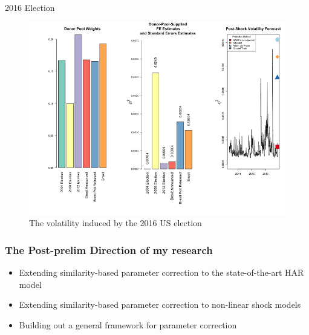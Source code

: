 \documentclass[9pt]{beamer}
\theoremstyle{definition}
\begin{document}
    \begin{frame}{2016 Election}
        \begin{figure}[H]
            \begin{center}
              \includegraphics[scale=.34]{real_data_output_plots/TueSep241059512024_IYG_None_None.png}
              \caption{The volatility induced by the 2016 US election}
              \label{fig:SVF_2016}
              \end{center}
            \end{figure}
    \end{frame}

\begin{frame}
    \frametitle{The Post-prelim Direction of my research}
    
    \begin{itemize}
        \item Extending similarity-based parameter correction to the state-of-the-art HAR model 
        \item Extending similarity-based parameter correction to non-linear shock models
        \item Building out a general framework for parameter correction 
    \end{itemize}
\end{frame}




\end{document}
